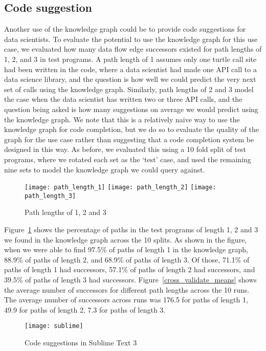 \subsection{Code suggestion}
Another use of the knowledge graph could be to provide code suggestions for data scientists.  To evaluate the potential to use the knowledge graph for this use case, we evaluated how many data flow edge successors existed for path lengths of 1, 2, and 3 in test programs.  A path length of 1 assumes only one turtle call site had been written in the code, where a data scientist had made one API call to a data science library, and the question is how well we could predict the very next set of calls using the knowledge graph.  Similarly, path lengths of 2 and 3 model the case when the data scientist has written two or three API calls, and the question being asked is how many suggestions on average we would predict using the knowledge graph.  We note that this is a relatively naive way to use the knowledge graph for code completion, but we do so to evaluate the quality of the graph for the use case rather than suggesting that a code completion system be designed in this way. As before, we evaluated this using a 10 fold split of test programs, where we rotated each set as the `test' case, and used the remaining nine sets to model the knowledge graph we could query against.  

\begin{figure}
\centering 
{\texttt{[image: path\_length\_1]}}%
\hfill 
{\texttt{[image: path\_length\_2]}}%
\hfill 
{\texttt{[image: path\_length\_3]}}%
\caption{Path lengths of 1, 2 and 3}
\label{cross_validate_paths}
\end{figure}

Figure~\ref{cross_validate_paths} shows the percentage of paths in the test programs of length 1, 2 and 3 we found in the knowledge graph across the 10 splits.  As shown in the figure, when we were able to find 97.5\% of paths of length 1 in the knowledge graph, 88.9\% of paths of length 2, and 68.9\% of paths of length 3.  Of those, 71.1\% of paths of length 1 had successors, 57.1\% of paths of length 2 had successors, and 39.5\% of paths of length 3 had successors.  Figure~\ref{cross_validate_means} shows the average number of successors for different path lengths across the 10 runs.  The average number of successors across runs was 176.5 for paths of length 1, 49.9 for paths of length 2, 7.3 for paths of length 3. 

\begin{figure}
\centering  
{\texttt{[image: sublime]}}
\caption{Code suggestions in Sublime Text 3}
\label{code_suggestion_ide}
\end{figure}
  
